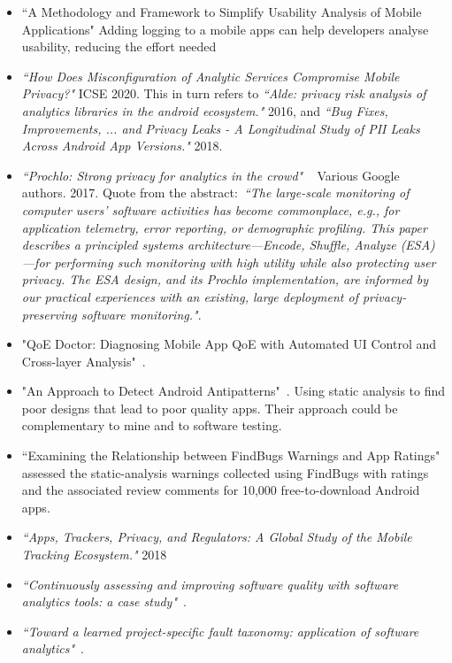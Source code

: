 \begin{itemize}
    \item ``A Methodology and Framework to Simplify Usability Analysis of Mobile Applications" Adding logging to a mobile apps can help developers analyse usability, reducing the effort needed
    
    \item \emph{``How Does Misconfiguration of Analytic Services Compromise Mobile Privacy?"} ICSE 2020. This in turn refers to \emph{``Alde: privacy risk analysis of analytics libraries in the android ecosystem."} 2016, and \emph{``Bug Fixes, Improvements, ... and Privacy Leaks - A Longitudinal Study of PII Leaks Across Android App Versions."} 2018.
    
    \item \emph{``Prochlo: Strong privacy for analytics in the crowd"}  ~\citep{prochlo2017_strong_privacy_analytics_in_the_crowd_46411} Various Google authors. 2017. Quote from the abstract:~\emph{``The large-scale monitoring of computer users' software activities has become commonplace, e.g., for application telemetry, error reporting, or demographic profiling. This paper describes a principled systems architecture---Encode, Shuffle, Analyze (ESA)---for performing such monitoring with high utility while also protecting user privacy. The ESA design, and its Prochlo implementation, are informed by our practical experiences with an existing, large deployment of privacy-preserving software monitoring."}.

    \item "QoE Doctor: Diagnosing Mobile App QoE with Automated UI Control and Cross-layer Analysis"~\cite{chen2014qoe}.
    \item "An Approach to Detect Android Antipatterns"~\cite{hecht2015approach}. Using static analysis to find poor designs that lead to poor quality apps. Their approach could be complementary to mine and to software testing.
    \item ``Examining the Relationship between FindBugs Warnings and App Ratings"~\cite{khalid2016_examining_the_relationship_between_findbugs_warnings_and_app_ratings} assessed the static-analysis warnings collected using FindBugs with ratings and the associated review comments for 10,000 free-to-download Android apps.
    
    \item \emph{``Apps, Trackers, Privacy, and Regulators: A Global Study of the Mobile Tracking Ecosystem."} 2018
    
    \item \emph{``Continuously assessing and improving software quality with software analytics tools: a case study"}~\cite{martinez_fernandez2019_continuously_assessing_and_improving_software_quallty_with_software_analytics_tools}.
    
    \item \emph{``Toward a learned project-specific fault taxonomy: application of software analytics"}~\cite{kidwell2015_toward_fault_taxonomy_application_of_software_analytics}.
    
\end{itemize}

